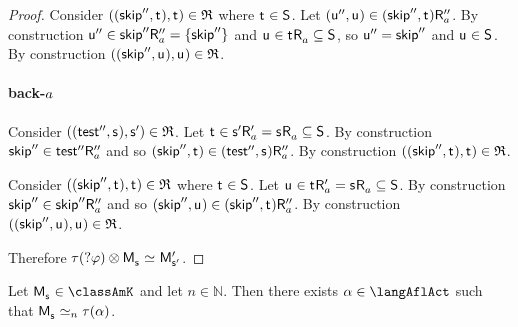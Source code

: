 \begin{proof}
Consider $((\aStateSkipPP, \aStateT), \aStateT) \in \bisimulation$ where $\aStateT \in \aStates$.
Let $(\aStateUPP, \aStateU) \in \aSuccessorsPPPA{(\aStateSkipPP, \aStateT)}$.
By construction ${\mathsf{{u}}^{\prime\prime}} \in {{\mathsf{{skip}}^{\prime\prime}}} {\mathsf{R}^{\prime\prime}_{a}} = \{{\mathsf{{skip}}^{\prime\prime}}\}$ and $\aStateU \in \aSuccessorsA{\aStateT} \subseteq \aStates$, so ${\mathsf{{u}}^{\prime\prime}} = {\mathsf{{skip}}^{\prime\prime}}$ and $\aStateU \in \aStates$.
By construction $((\aStateSkipPP, \aStateU), \aStateU) \in \bisimulation$.

\paragraph{back-$a$}
Consider $((\aStateTestPP, \aStateS), \aStateSP) \in \bisimulation$.
Let $\aStateT \in \aSuccessorsPA{\aStateSP} = \aSuccessorsA{\aStateS} \subseteq \aStates$.
By construction ${\mathsf{{skip}}^{\prime\prime}} \in {{\mathsf{{test}}^{\prime\prime}}} {\mathsf{R}^{\prime\prime}_{a}}$ and so $(\aStateSkipPP, \aStateT) \in \aSuccessorsPPA{(\aStateTestPP, \aStateS)}$.
By construction $((\aStateSkipPP, \aStateT), \aStateT) \in \bisimulation$.

Consider $((\aStateSkipPP, \aStateT), \aStateT) \in \bisimulation$ where $\aStateT \in \aStates$.
Let $\aStateU \in \aSuccessorsPA{\aStateT} = \aSuccessorsA{\aStateS} \subseteq \aStates$.
By construction ${\mathsf{{skip}}^{\prime\prime}} \in {{\mathsf{{skip}}^{\prime\prime}}} {\mathsf{R}^{\prime\prime}_{a}}$ and so $(\aStateSkipPP, \aStateU) \in \aSuccessorsPPA{(\aStateSkipPP, \aStateT)}$.
By construction $((\aStateSkipPP, \aStateU), \aStateU) \in \bisimulation$.

Therefore $\tau(\test{\phi}) \exec \aPModel{\aStateS} \bisimilar \aPModelP{\aStateSP}$.
\end{proof}

\begin{theorem}\label{afl-k-correspondence}
Let $\aPModel{\aStateS} \in \classAmK$ and let $n \in \mathbb{N}$. 
Then there exists $\alpha \in \langAflAct$ such that $\aPModel{\aStateS} \bisimilar[n] \tau(\alpha)$.
\end{theorem}

